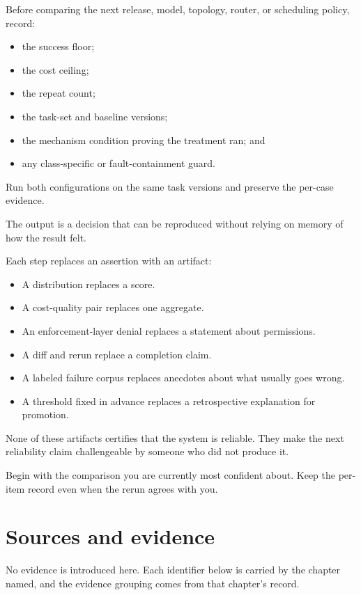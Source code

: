 Before comparing the next release, model, topology, router, or scheduling policy, record:

\begin{itemize}
\tightlist
\item
  the success floor;
\item
  the cost ceiling;
\item
  the repeat count;
\item
  the task-set and baseline versions;
\item
  the mechanism condition proving the treatment ran; and
\item
  any class-specific or fault-containment guard.
\end{itemize}

Run both configurations on the same task versions and preserve the per-case evidence.

The output is a decision that can be reproduced without relying on memory of how the result felt.

Each step replaces an assertion with an artifact:

\begin{itemize}
\tightlist
\item
  A distribution replaces a score.
\item
  A cost-quality pair replaces one aggregate.
\item
  An enforcement-layer denial replaces a statement about permissions.
\item
  A diff and rerun replace a completion claim.
\item
  A labeled failure corpus replaces anecdotes about what usually goes wrong.
\item
  A threshold fixed in advance replaces a retrospective explanation for promotion.
\end{itemize}

None of these artifacts certifies that the system is reliable. They make the next reliability claim challengeable by someone who did not produce it.

Begin with the comparison you are currently most confident about. Keep the per-item record even when the rerun agrees with you.

\section*{Sources and evidence}

No evidence is introduced here. Each identifier below is carried by the chapter named, and the evidence grouping comes from that chapter's record.

